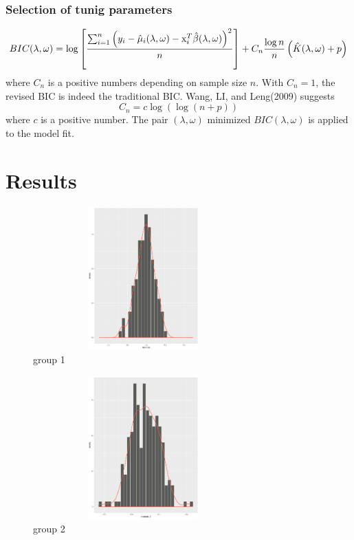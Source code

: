 \documentclass[cjk,10pt]{beamer}
\begin{document}
\begin{CJK*}{GBK}{song}
\begin{frame}
\end{frame}
\begin{frame}

\frametitle{Selection of tunig parameters}

$$BIC(\lambda,\omega)=\log\left[\frac{\sum_{i=1}^n\left(y_i-\hat{\mu}_i(\lambda,\omega)-{\rm x}_i^T\hat{\beta}(\lambda,\omega)\right)^2}{n}\right]+C_n\frac{\log n}{n}\left(\hat{K}(\lambda,\omega)+p\right)$$
where $C_n$ is a positive numbers depending on sample size $n$. With $C_n=1$, the revised BIC is indeed the traditional BIC. Wang, LI, and Leng(2009) suggests
$$C_n=c\log(\log(n+p))$$
where $c$ is a positive number. The pair $(\lambda,\omega)$ minimized $BIC(\lambda,\omega)$ is applied to the model fit.

  \end{frame}
\section{Results}
\begin{frame}
    \begin{figure}[htbp]
\centering
\includegraphics[height=5.5cm, width=8.5cm]{Rplot-2}
\caption{group 1}
\end{figure}


\end{frame}
\begin{frame}

\begin{figure}[htbp]
\centering
\includegraphics[height=5.5cm, width=8.5cm]{Rplot_3}
\caption{group 2}
\end{figure}
\end{frame}


\end{CJK*}
\end{document}

